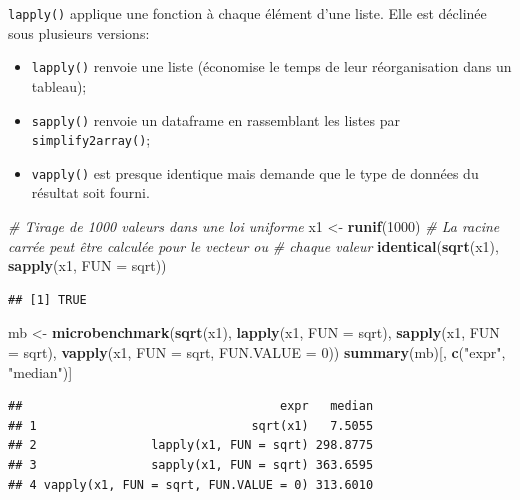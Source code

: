 \documentclass[
  12pt,
  french,
  a4paper,
  extrafontsizes,onecolumn,openright
  ]{memoir}
\newenvironment{Shaded}{\begin{snugshade}}{\end{snugshade}}
\newcommand{\CommentTok}[1]{\textcolor[rgb]{0.56,0.35,0.01}{\textit{#1}}}
\newcommand{\DataTypeTok}[1]{\textcolor[rgb]{0.13,0.29,0.53}{#1}}
\newcommand{\DecValTok}[1]{\textcolor[rgb]{0.00,0.00,0.81}{#1}}
\newcommand{\KeywordTok}[1]{\textcolor[rgb]{0.13,0.29,0.53}{\textbf{#1}}}
\newcommand{\NormalTok}[1]{#1}
\newcommand{\StringTok}[1]{\textcolor[rgb]{0.31,0.60,0.02}{#1}}
\providecommand{\tightlist}{%
  \setlength{\itemsep}{0pt}\setlength{\parskip}{0pt}}
\begin{document}
\texttt{lapply()} applique une fonction à chaque élément d'une liste.
Elle est déclinée sous plusieurs versions:

\begin{itemize}
\tightlist
\item
  \texttt{lapply()} renvoie une liste (économise le temps de leur réorganisation dans un tableau);
\item
  \texttt{sapply()} renvoie un dataframe en rassemblant les listes par \texttt{simplify2array()};
\item
  \texttt{vapply()} est presque identique mais demande que le type de données du résultat soit fourni.
\end{itemize}

\scriptsize

\begin{Shaded}
\begin{Highlighting}[]
\CommentTok{# Tirage de 1000 valeurs dans une loi uniforme}
\NormalTok{x1 <-}\StringTok{ }\KeywordTok{runif}\NormalTok{(}\DecValTok{1000}\NormalTok{)}
\CommentTok{# La racine carrée peut être calculée pour le vecteur ou}
\CommentTok{# chaque valeur}
\KeywordTok{identical}\NormalTok{(}\KeywordTok{sqrt}\NormalTok{(x1), }\KeywordTok{sapply}\NormalTok{(x1, }\DataTypeTok{FUN =}\NormalTok{ sqrt))}
\end{Highlighting}
\end{Shaded}

\begin{verbatim}
## [1] TRUE
\end{verbatim}

\begin{Shaded}
\begin{Highlighting}[]
\NormalTok{mb <-}\StringTok{ }\KeywordTok{microbenchmark}\NormalTok{(}\KeywordTok{sqrt}\NormalTok{(x1), }\KeywordTok{lapply}\NormalTok{(x1, }\DataTypeTok{FUN =}\NormalTok{ sqrt), }\KeywordTok{sapply}\NormalTok{(x1, }
    \DataTypeTok{FUN =}\NormalTok{ sqrt), }\KeywordTok{vapply}\NormalTok{(x1, }\DataTypeTok{FUN =}\NormalTok{ sqrt, }\DataTypeTok{FUN.VALUE =} \DecValTok{0}\NormalTok{))}
\KeywordTok{summary}\NormalTok{(mb)[, }\KeywordTok{c}\NormalTok{(}\StringTok{"expr"}\NormalTok{, }\StringTok{"median"}\NormalTok{)]}
\end{Highlighting}
\end{Shaded}

\begin{verbatim}
##                                    expr   median
## 1                              sqrt(x1)   7.5055
## 2                lapply(x1, FUN = sqrt) 298.8775
## 3                sapply(x1, FUN = sqrt) 363.6595
## 4 vapply(x1, FUN = sqrt, FUN.VALUE = 0) 313.6010
\end{verbatim}
\end{document}
